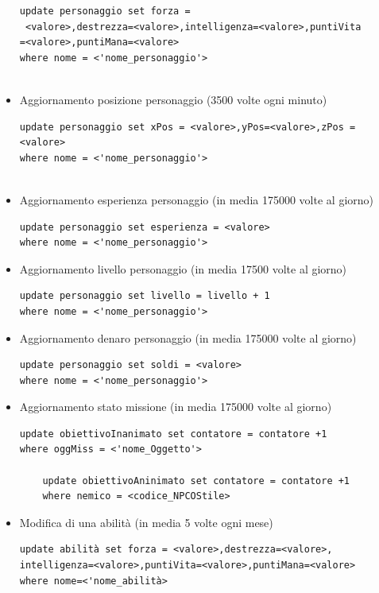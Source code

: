 \begin{itemize}
\begin{verbatim}
update personaggio set forza =
 <valore>,destrezza=<valore>,intelligenza=<valore>,puntiVita
=<valore>,puntiMana=<valore>
where nome = <'nome_personaggio'>


\end{verbatim}
\item Aggiornamento posizione personaggio (3500 volte ogni minuto)

\begin{verbatim}
update personaggio set xPos = <valore>,yPos=<valore>,zPos = <valore>
where nome = <'nome_personaggio'>


\end{verbatim}
\item Aggiornamento esperienza personaggio (in media 175000 volte al giorno)

\begin{verbatim}
update personaggio set esperienza = <valore>
where nome = <'nome_personaggio'>

\end{verbatim}
\item Aggiornamento livello personaggio (in media 17500 volte al giorno)

\begin{verbatim}
update personaggio set livello = livello + 1
where nome = <'nome_personaggio'>

\end{verbatim}
\item Aggiornamento denaro personaggio (in media 175000 volte al giorno)

\begin{verbatim}
update personaggio set soldi = <valore>
where nome = <'nome_personaggio'>

\end{verbatim}

\item Aggiornamento stato missione (in media 175000 volte al giorno)

\begin{verbatim}
update obiettivoInanimato set contatore = contatore +1
where oggMiss = <'nome_Oggetto'>

	update obiettivoAninimato set contatore = contatore +1
	where nemico = <codice_NPCOStile>

\end{verbatim}
\item Modifica di una abilità (in media 5 volte ogni mese)

\begin{verbatim}
update abilità set forza = <valore>,destrezza=<valore>,
intelligenza=<valore>,puntiVita=<valore>,puntiMana=<valore>
where nome=<'nome_abilità>



\end{verbatim}
\end{itemize}
